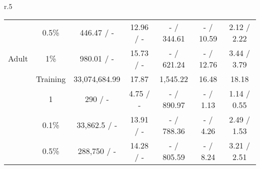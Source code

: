 \begin{wraptable}[23]{r}{.5\textwidth}
{\begin{tabular}{ccccccc}
                                                     & 0.5\%                           & 446.47 / -                                                          & 12.96 / -                                                        & - / 344.61                                                            & - / 10.59                                                             & 2.12 / 2.22                        \\
\multirow{-5}{*}{Adult}                              & 1\%                             & 980.01 / -                                                          & 15.73 / -                                                        & - / 621.24                                                            & - / 12.76                                                             & 3.44 / 3.79                        \\\midrule
                                                     & Training                        & 33,074,684.99                                                       & 17.87                                                            & 1,545.22                                                              & 16.48                                                                 & 18.18                              \\
                                                     & 1                               & 290 / -                                                             & 4.75 / -                                                         & - / 890.97                                                            & - / 1.13                                                              & 1.14 / 0.55                        \\
                                                     & 0.1\%                           & 33,862.5 / -                                                        & 13.91 / -                                                        & - / 788.36                                                            & - / 4.26                                                              & 2.49 / 1.53                        \\
                                                     & 0.5\%                           & 288,750 / -                                                         & 14.28 / -                                                        & - / 805.59                                                            & - / 8.24                                                              & 3.21 / 2.51                        \\

\end{tabular}}
\end{wraptable}
